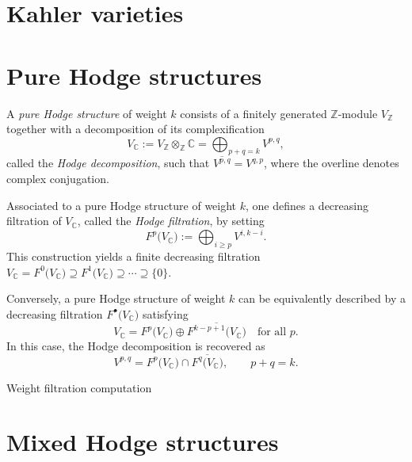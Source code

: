 
\section{Kahler varieties}



\section{Pure Hodge structures}

\begin{Definition}
A \emph{pure Hodge structure} of weight $k$ consists of a finitely generated $\mathbb{Z}$-module $V_{\mathbb{Z}}$ together with a decomposition of its complexification
\[
V_{\mathbb{C}} := V_{\mathbb{Z}} \otimes_{\mathbb{Z}} \mathbb{C}
= \bigoplus_{p+q=k} V^{p,q},
\]
called the \emph{Hodge decomposition}, such that $\overline{V^{p,q}} = V^{q,p}$, where the overline denotes complex conjugation.

\end{Definition}

Associated to a pure Hodge structure of weight $k$, one defines a decreasing filtration of $V_{\mathbb{C}}$, called the \emph{Hodge filtration}, by setting
\[
F^p\bigl(V_{\mathbb{C}}\bigr) := \bigoplus_{i \geq p} V^{i,k-i}.
\]
This construction yields a finite decreasing filtration $V_{\mathbb{C}} = F^0\bigl(V_{\mathbb{C}}\bigr) \supseteq
F^1\bigl(V_{\mathbb{C}}\bigr) \supseteq \cdots \supseteq \{0\}.$


Conversely, a pure Hodge structure of weight $k$ can be equivalently described by a decreasing filtration
$F^\bullet\bigl(V_{\mathbb{C}}\bigr)$ satisfying
\[
V_{\mathbb{C}} =
F^p\bigl(V_{\mathbb{C}}\bigr)
\oplus
\overline{F^{k-p+1}\bigl(V_{\mathbb{C}}\bigr)}
\quad \text{for all } p.
\]
In this case, the Hodge decomposition is recovered as
\[
V^{p,q}
=
F^p\bigl(V_{\mathbb{C}}\bigr)
\cap
\overline{F^q\bigl(V_{\mathbb{C}}\bigr)},
\qquad p+q = k.
\]

\begin{Example}
	Weight filtration computation
\end{Example}

\section{Mixed Hodge structures}


